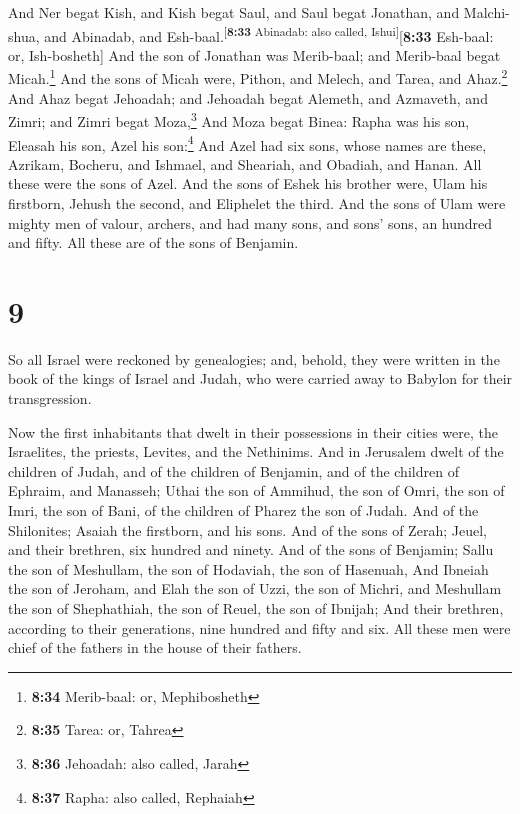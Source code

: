  And Ner begat Kish, and Kish begat Saul, and Saul begat
Jonathan, and Malchi-shua, and Abinadab, and
Esh-baal.\textsuperscript{{[}\textbf{8:33} Abinadab: also called,
Ishui{]}}{[}\textbf{8:33} Esh-baal: or, Ish-bosheth{]} 
And the son of Jonathan was Merib-baal; and Merib-baal begat
Micah.\footnote{\textbf{8:34} Merib-baal: or, Mephibosheth}
 And the sons of Micah were, Pithon, and Melech, and
Tarea, and Ahaz.\footnote{\textbf{8:35} Tarea: or, Tahrea}
 And Ahaz begat Jehoadah; and Jehoadah begat Alemeth, and
Azmaveth, and Zimri; and Zimri begat Moza,\footnote{\textbf{8:36}
  Jehoadah: also called, Jarah}  And Moza begat Binea:
Rapha was his son, Eleasah his son, Azel his son:\footnote{\textbf{8:37}
  Rapha: also called, Rephaiah}  And Azel had six sons,
whose names are these, Azrikam, Bocheru, and Ishmael, and Sheariah, and
Obadiah, and Hanan. All these were the sons of Azel.  And
the sons of Eshek his brother were, Ulam his firstborn, Jehush the
second, and Eliphelet the third.  And the sons of Ulam
were mighty men of valour, archers, and had many sons, and sons' sons,
an hundred and fifty. All these are of the sons of Benjamin.

\hypertarget{section-8}{%
\section{9}\label{section-8}}

 So all Israel were reckoned by genealogies; and, behold,
they were written in the book of the kings of Israel and Judah, who were
carried away to Babylon for their transgression.

 Now the first inhabitants that dwelt in their possessions
in their cities were, the Israelites, the priests, Levites, and the
Nethinims.  And in Jerusalem dwelt of the children of
Judah, and of the children of Benjamin, and of the children of Ephraim,
and Manasseh;  Uthai the son of Ammihud, the son of Omri,
the son of Imri, the son of Bani, of the children of Pharez the son of
Judah.  And of the Shilonites; Asaiah the firstborn, and
his sons.  And of the sons of Zerah; Jeuel, and their
brethren, six hundred and ninety.  And of the sons of
Benjamin; Sallu the son of Meshullam, the son of Hodaviah, the son of
Hasenuah,  And Ibneiah the son of Jeroham, and Elah the
son of Uzzi, the son of Michri, and Meshullam the son of Shephathiah,
the son of Reuel, the son of Ibnijah;  And their brethren,
according to their generations, nine hundred and fifty and six. All
these men were chief of the fathers in the house of their fathers.

